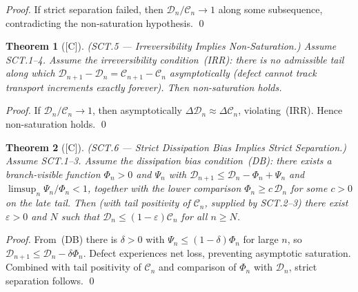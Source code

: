 \documentclass[12pt,oneside]{amsbook}
\theoremstyle{plain}
\newtheorem{theorem}{Theorem}[section]
\theoremstyle{definition}
\theoremstyle{remark}
\newcommand{\status}[1]{\textup{[#1]}}
\begin{document}
\begin{proof}
If strict separation failed, then $\mathcal{D}_n/\mathcal{C}_n \to 1$
along some subsequence, contradicting the non-saturation hypothesis. \qed
\end{proof}

\begin{theorem}[\status{C}]\label{thm:SCT5}
\textup{(SCT.5 --- Irreversibility Implies Non-Saturation.)}
Assume SCT.1--4.  Assume the \emph{irreversibility condition}~(IRR):
there is no admissible tail along which
$\mathcal{D}_{n+1} - \mathcal{D}_n = \mathcal{C}_{n+1} - \mathcal{C}_n$
asymptotically (defect cannot track transport increments exactly
forever).  Then non-saturation holds.
\end{theorem}

\begin{proof}
If $\mathcal{D}_n/\mathcal{C}_n \to 1$, then asymptotically
$\Delta\mathcal{D}_n \approx \Delta\mathcal{C}_n$,
violating~(IRR).  Hence non-saturation holds. \qed
\end{proof}

\begin{theorem}[\status{C}]\label{thm:SCT6}
\textup{(SCT.6 --- Strict Dissipation Bias Implies Strict
Separation.)}
Assume SCT.1--3.  Assume the \emph{dissipation bias condition}~(DB):
there exists a branch-visible function $\Phi_n > 0$ and $\Psi_n$ with
$\mathcal{D}_{n+1} \leq \mathcal{D}_n - \Phi_n + \Psi_n$ and
$\limsup_n \Psi_n/\Phi_n < 1$, together with the lower comparison
$\Phi_n \geq c\,\mathcal{D}_n$ for some $c > 0$ on the late tail.
Then (with tail positivity of $\mathcal{C}_n$, supplied by
SCT.2--3) there exist $\varepsilon > 0$ and $N$ such that
$\mathcal{D}_n \leq (1-\varepsilon)\mathcal{C}_n$ for all $n \geq N$.
\end{theorem}

\begin{proof}
From~(DB) there is $\delta > 0$ with $\Psi_n \leq (1-\delta)\Phi_n$
for large $n$, so $\mathcal{D}_{n+1} \leq \mathcal{D}_n -
\delta\Phi_n$.  Defect experiences net loss, preventing
asymptotic saturation.  Combined with tail positivity of
$\mathcal{C}_n$ and comparison of $\Phi_n$ with $\mathcal{D}_n$,
strict separation follows. \qed
\end{proof}
\end{document}
